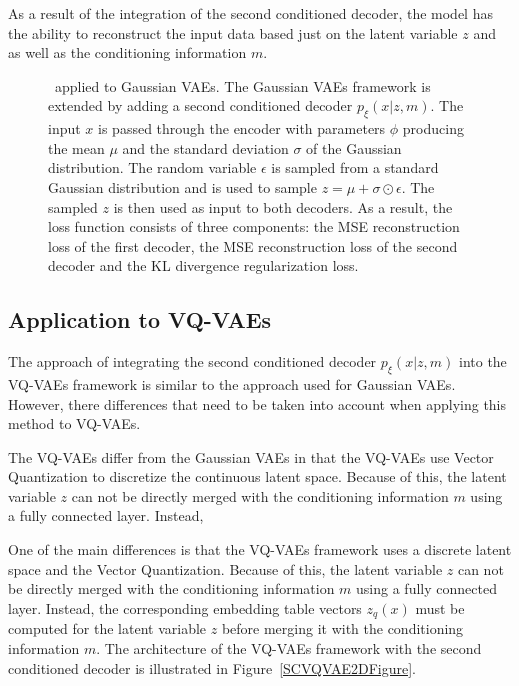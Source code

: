 As a result of the integration of the second conditioned decoder, the model has
the ability to reconstruct the input data based just on the latent variable $z$
and as well as the conditioning information $m$.
\begin{figure}[H]
    \centering
    
    \caption[ applied to Gaussian VAEs.]%
    {
        \methodOne\ applied to Gaussian VAEs. The Gaussian VAEs framework is extended by adding a second conditioned decoder $p_\xi(x|z,m)$. The input $x$ is passed through the encoder with parameters $\phi$ producing the mean $\mu$ and the standard deviation $\sigma$ of the Gaussian distribution. The random variable $\epsilon$ is sampled from a standard Gaussian distribution and is used to sample $ z = \mu + \sigma \odot \epsilon$. The sampled $z$ is then used as input to both decoders. As a result, the loss function consists of three components: the MSE reconstruction loss of the first decoder, the MSE reconstruction loss of the second decoder and the KL divergence regularization loss.
    }\label{SCVAE2DFigure}
\end{figure}

\subsection{Application to VQ-VAEs}

The approach of integrating the second conditioned decoder $p_\xi(x|z,m)$ into
the VQ-VAEs framework is similar to the approach used for Gaussian VAEs.
However, there differences that need to be taken into account when applying
this method to VQ-VAEs.

The VQ-VAEs differ from the Gaussian VAEs in that the VQ-VAEs use Vector
Quantization to discretize the continuous latent space. Because of this, the
latent variable $z$ can not be directly merged with the conditioning
information $m$ using a fully connected layer. Instead,

One of the main differences is that the VQ-VAEs framework uses a discrete
latent space and the Vector Quantization. Because of this, the latent variable
$z$ can not be directly merged with the conditioning information $m$ using a
fully connected layer. Instead, the corresponding embedding table vectors
$z_q(x)$ must be computed for the latent variable $z$ before merging it with
the conditioning information $m$. The architecture of the VQ-VAEs framework
with the second conditioned decoder is illustrated in
Figure~\ref{SCVQVAE2DFigure}.

